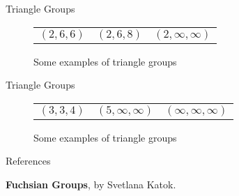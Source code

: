 \documentclass[
	american,
	sections numbered,
	usenames,
	xcolor=dvipsnames,
	aspectratio=169,
]{beamer}
\theoremstyle{plain}%
\begin{document}
\begin{frame}{Triangle Groups}

	\begin{figure}
        \centering
        \begin{tabular}{ccc}
        
        $(2,6,6)$ & $(2,6,8)$ & $(2,\infty,\infty)$ \\[6pt]
        
        \end{tabular}
        \caption{Some examples of triangle groups}
        \label{fig:tri}
    \end{figure}

\end{frame}

\begin{frame}{Triangle Groups}

	\begin{figure}
        \centering
        \begin{tabular}{ccc}
        
        $(3,3,4)$ & $(5,\infty,\infty)$ & $(\infty,\infty,\infty)$ \\[6pt]
        
        \end{tabular}
        \caption{Some examples of triangle groups}
        \label{fig:tri}
    \end{figure}

\end{frame}

\appendix

\begin{frame}[allowframebreaks]{References}
	\begin{thebibliography}{9}
         \textbf{Fuchsian Groups}, by Svetlana Katok.
    \end{thebibliography}
\end{frame}
\end{document}
